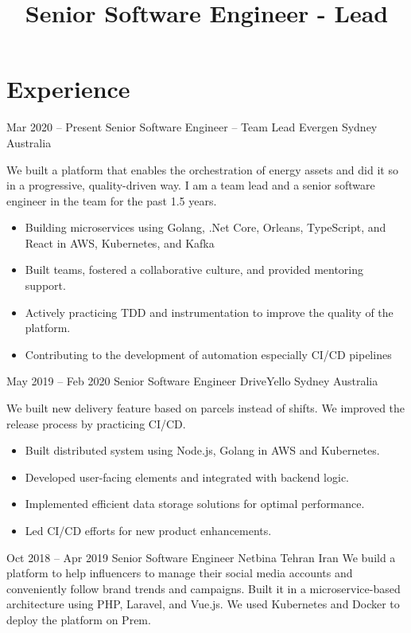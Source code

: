 \documentclass[12pt, a4paper, sans]{moderncv}
\title{Senior Software Engineer - Lead}
\begin{document}
    \makecvtitle


    \section{Experience}\label{sec:experience}

    \cventry
    {Mar 2020 -- Present}
    {Senior Software Engineer -- Team Lead}
    {\newline Evergen}
    {Sydney}
    {Australia}
    {
        We built a platform that enables the orchestration of energy assets and did it so in a progressive, quality-driven way.
        I am a team lead and a senior software engineer in the team for the past 1.5 years.
        \begin{itemize}
            \item Building microservices using Golang, .Net Core, Orleans, TypeScript, and React in AWS, Kubernetes, and Kafka
            \item Built teams, fostered a collaborative culture, and provided mentoring support.
            \item Actively practicing TDD and instrumentation to improve the quality of the platform.
            \item Contributing to the development of automation especially CI/CD pipelines
        \end{itemize}
    }

    \cventry
    {May 2019 -- Feb 2020}
    {Senior Software Engineer}
    {\newline DriveYello}
    {Sydney}
    {Australia}
    {
        We built new delivery feature based on parcels instead of shifts.
        We improved the release process by practicing CI/CD.
        \begin{itemize}
            \item Built distributed system using Node.js, Golang in AWS and Kubernetes.
            \item Developed user-facing elements and integrated with backend logic.
            \item Implemented efficient data storage solutions for optimal performance.
            \item Led CI/CD efforts for new product enhancements.
        \end{itemize}
    }

    \cventry
    {Oct 2018 -- Apr 2019}
    {Senior Software Engineer}
    {\newline Netbina}
    {Tehran}
    {Iran}
    {
        We build a platform to help influencers to manage their social media accounts and conveniently follow brand trends and campaigns.
        Built it in a microservice-based architecture using PHP, Laravel, and Vue.js.
        We used Kubernetes and Docker to deploy the platform on Prem.
    }
\end{document}
